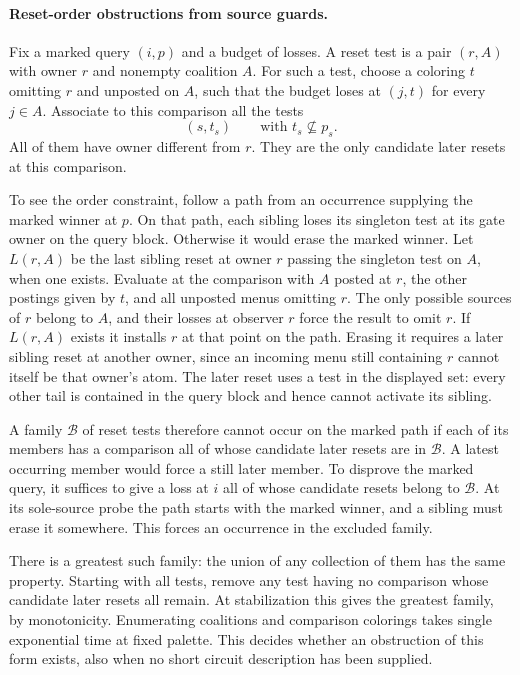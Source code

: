 \paragraph{Reset-order obstructions from source guards.}
Fix a marked query $(i,p)$ and a budget of losses.
A reset test is a pair $(r,A)$ with owner $r$ and
nonempty coalition $A$. For such a test, choose a
coloring $t$ omitting $r$ and unposted on $A$, such
that the budget loses at $(j,t)$ for every $j\in A$.
Associate to this comparison all the tests
\[
                    (s,t_s)\qquad\text{with }t_s\not\subseteq p_s .
\]
All of them have owner different from $r$. They
are the only candidate later resets at this
comparison.

To see the order constraint, follow a path from
an occurrence supplying the marked winner at
$p$. On that path, each sibling loses its
singleton test at its gate owner on the query
block. Otherwise it would erase the marked
winner. Let $L(r,A)$ be the last sibling reset
at owner $r$ passing the singleton test on $A$,
when one exists. Evaluate at the comparison
with $A$ posted at $r$, the other postings
given by $t$, and all unposted menus omitting
$r$. The only possible sources of $r$ belong
to $A$, and their losses at observer $r$ force
the result to omit $r$. If $L(r,A)$ exists it
installs $r$ at that point on the path. Erasing
it requires a later sibling reset at another
owner, since an incoming menu still containing
$r$ cannot itself be that owner's atom. The
later reset uses a test in the displayed set:
every other tail is contained in the query
block and hence cannot activate its sibling.

A family $\mathcal B$ of reset tests therefore
cannot occur on the marked path if each of its
members has a comparison all of whose candidate
later resets are in $\mathcal B$. A latest
occurring member would force a still later
member. To disprove the marked query, it suffices
to give a loss at $i$ all of whose candidate
resets belong to $\mathcal B$. At its sole-source
probe the path starts with the marked winner,
and a sibling must erase it somewhere. This
forces an occurrence in the excluded family.

There is a greatest such family: the union of
any collection of them has the same property.
Starting with all tests, remove any test having
no comparison whose candidate later resets
all remain. At stabilization this gives the
greatest family, by monotonicity. Enumerating
coalitions and comparison colorings takes
single exponential time at fixed palette.
This decides whether an obstruction of this
form exists, also when no short circuit
description has been supplied.

